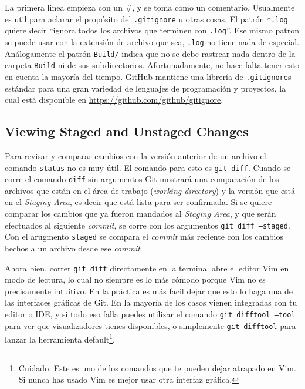 \documentclass[spanish, 12pt, a4paper]{article}
\begin{document}
La primera linea empieza con un \#, y se toma como un comentario.
Usualmente es util para aclarar el propósito del \texttt{.gitignore} u otras
cosas.
El patrón \texttt{*.log} quiere decir ``ignora todos los archivos que terminen
con \texttt{.log}''.
Ese mismo patron se puede usar con la extensión de archivo que sea,
\texttt{.log} no tiene nada de especial.
Análogamente el patrón \texttt{Build/} indica que no se debe rastrear nada
dentro de la carpeta \texttt{Build} ni de sus subdirectorios.
Afortunadamente, no hace falta tener esto en cuenta la mayoría del tiempo.
GitHub mantiene una librería de \texttt{.gitignore}s estándar para una gran
variedad de lenguajes de programación y proyectos, la cual está disponible en
\url{https://github.com/github/gitignore}.

\subsection{Viewing Staged and Unstaged Changes}
Para revisar y comparar cambios con la versión anterior de un archivo el comando
\texttt{status} no es muy útil.
El comando para esto es \texttt{git diff}.
Cuando se corre el comando \texttt{diff} sin argumentos Git mostrará una
comparación de los archivos que están en el área de trabajo (\textit{working
directory}) y la versión que está en el \textit{Staging Area}, es decir que está
lista para ser confirmada.
Si se quiere comparar los cambios que ya fueron mandados al \textit{Staging
Area}, y que serán efectuados al siguiente \textit{commit}, se corre con los
argumentos \texttt{git diff --staged}.
Con el arugmento \texttt{staged} se compara el \textit{commit} más reciente con
los cambios hechos a un archivo desde ese \textit{commit}.

Ahora bien, correr \texttt{git diff} directamente en la terminal abre el editor
Vim en modo de lectura, lo cual no siempre es lo más cómodo porque Vim no es
precisamente intuitivo.
En la práctica es más facil dejar que esto lo haga una de las interfaces
gráficas de Git.
En la mayoría de los casos vienen integradas con tu editor o IDE, y si todo eso
falla puedes utilizar el comando \texttt{git difftool --tool} para ver que
visualizadores tienes disponibles, o simplemente \texttt{git difftool} para
lanzar la herramienta default\footnote{Cuidado. Este es uno de los comandos que
te pueden dejar atrapado en Vim. Si nunca has usado Vim es mejor usar otra
interfaz gráfica.}.
\end{document}

